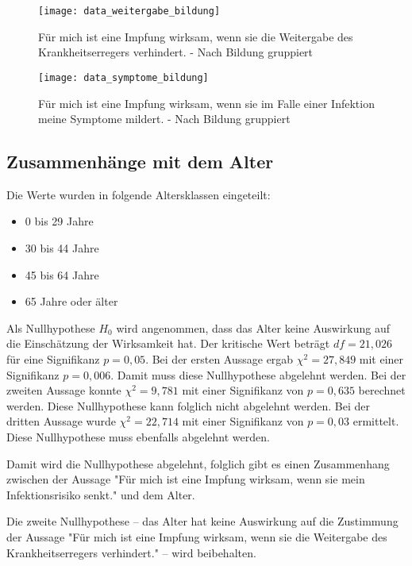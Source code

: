 \begin{figure}[ht]
    \caption{Für mich ist eine Impfung wirksam, wenn sie die Weitergabe des Krankheitserregers verhindert. - Nach Bildung gruppiert}
    \label{fig:vgl_weitergabe_bildung}
    \centering
    \texttt{[image: data\_weitergabe\_bildung]}
\end{figure}

\begin{figure}[ht]
    \caption{Für mich ist eine Impfung wirksam, wenn sie im Falle einer Infektion meine Symptome mildert. - Nach Bildung gruppiert}
    \label{fig:vgl_symptome_bildung}
    \centering
    \texttt{[image: data\_symptome\_bildung]}
\end{figure}

\subsection{Zusammenhänge mit dem Alter}

Die Werte wurden in folgende Altersklassen eingeteilt:
\begin{itemize}
    \item 0 bis 29 Jahre
    \item 30 bis 44 Jahre
    \item 45 bis 64 Jahre
    \item 65 Jahre oder älter
\end{itemize}
Als Nullhypothese \(H_0\) wird angenommen, dass das Alter keine Auswirkung auf die Einschätzung der Wirksamkeit hat.
Der kritische Wert beträgt \(df = 21,026\) für eine Signifikanz \(p = 0,05\). Bei der ersten Aussage ergab \(\chi^2 = 27,849\) mit einer Signifikanz \(p = 0,006\). Damit muss diese Nullhypothese abgelehnt werden.
Bei der zweiten Aussage konnte \(\chi^2 = 9,781\) mit einer Signifikanz von \(p = 0,635\) berechnet werden. Diese Nullhypothese kann folglich nicht abgelehnt werden.
Bei der dritten Aussage wurde  \(\chi^2 = 22,714\) mit einer Signifikanz von \(p = 0,03\) ermittelt. Diese Nullhypothese muss ebenfalls abgelehnt werden.

Damit wird die Nullhypothese abgelehnt, folglich gibt es einen Zusammenhang zwischen der Aussage "Für mich ist eine Impfung wirksam, wenn sie mein Infektionsrisiko senkt." und dem Alter.

Die zweite Nullhypothese -- das Alter hat keine Auswirkung auf die Zustimmung der Aussage "Für mich ist eine Impfung wirksam, wenn sie die Weitergabe des Krankheitserregers verhindert." -- wird beibehalten.

